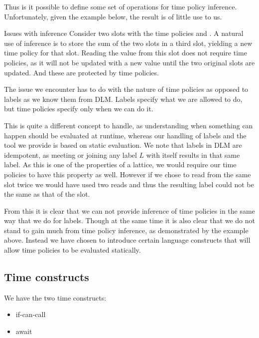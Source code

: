 Thus is it possible to define some set of operations for time policy inference.
Unfortunately, given the example below, the result is of little use to us.

\begin{example}{Issues with inference}
  Consider two slots with the time policies  and .
  A natural use of inference is to store the sum of the two slots in a third slot, yielding a new time policy for that slot.
  Reading the value from this slot does not require time policies, as it will not be updated with a new value until the two original slots are updated.
  And these are protected by time policies.
\end{example}

The issue we encounter has to do with the nature of time policies as opposed to labels as we know them from DLM.
Labels specify what we are allowed to do, but time policies specify only when we can do it.

This is quite a different concept to handle, as understanding when something can happen should be evaluated at runtime, whereas our handling of labels and the tool we provide is based on static evaluation.
We note that labels in DLM are idempotent, as meeting or joining any label $L$ with itself results in that same label.
As this is one of the properties of a lattice, we would require our time policies to have this property as well.
However if we chose to read from the same slot twice we would have used two reads and thus the resulting label could not be the same as that of the slot.

From this it is clear that we can not provide inference of time policies in the same way that we do for labels.
Though at the same time it is also clear that we do not stand to gain much from time policy inference, as demonstrated by the example above.
Instead we have chosen to introduce certain language constructs that will allow time policies to be evaluated statically.

\subsection{Time constructs}
We have the two time constructs:

\begin{itemize}
  \item if-can-call 
  \item await 
\end{itemize}

